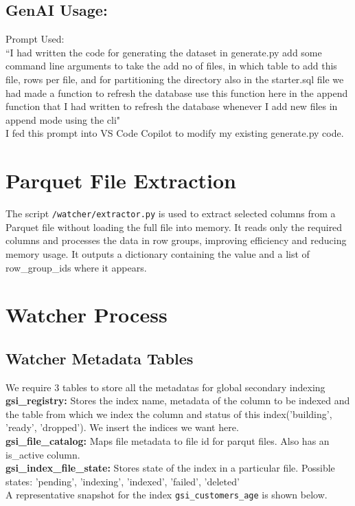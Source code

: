\documentclass[11pt, a4paper]{article}
\begin{document}
\subsection{GenAI Usage:}
Prompt Used:
\\
``I had written the code for generating the dataset in generate.py add some command line arguments to take the add no of files, in which table to add this file, rows per file, and for partitioning the directory also in the starter.sql file we had made a function to refresh the database use this function here in the append function that I had written to refresh the database whenever I add new files in append mode using the cli"
\\
I fed this prompt into VS Code Copilot to modify my existing generate.py code.

\section{Parquet File Extraction}
The script \texttt{/watcher/extractor.py} is used to extract selected columns from a Parquet file without loading the full file into memory. It reads only the required columns and processes the data in row groups, improving efficiency and reducing memory usage. It outputs a dictionary containing the value and a list of row\_group\_ids where it appears.


\section{Watcher Process}
\subsection{Watcher Metadata Tables}
We require 3 tables to store all the metadatas for global secondary indexing \\
\textbf{gsi\_registry: } Stores the index name, metadata of the column to be indexed and the table from which we index the column and status of this index('building', 'ready', 'dropped'). We insert the indices we want here.\\
\textbf{gsi\_file\_catalog: } Maps file metadata to file id for parqut files. Also has an is\_active column.\\
\textbf{gsi\_index\_file\_state: } Stores state of the index in a particular file. Possible states: {'pending', 'indexing', 'indexed', 'failed', 'deleted'}\\
\noindent A representative snapshot for the index \texttt{gsi\_customers\_age} is shown below.
\end{document}
